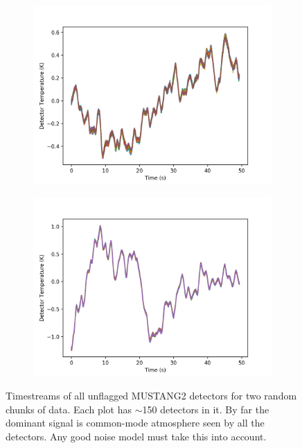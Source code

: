 \documentclass[12]{article}
\begin{document}
\begin{figure}
    \centering
    \begin{subfigure}[t]{0.45\textwidth}
        \centering
        \includegraphics[width=\linewidth]{plots/all_detectors_AGBT18B_215_08-s60.png}
    \end{subfigure}
    \hfill
    \begin{subfigure}[t]{0.45\textwidth}
        \centering
        \includegraphics[width=\linewidth]{plots/all_detectors_AGBT18B_215_04-s101.png}
    \end{subfigure}
    \caption{Timestreams of all unflagged MUSTANG2 detectors for two random
      chunks of data.  Each plot has $\sim$150 detectors in it.  By
      far the dominant signal is common-mode atmosphere seen by all
      the detectors. Any good noise model must take this into account.}
    \label{fig:mustang_atmosphere}
\end{figure}
\end{document}
